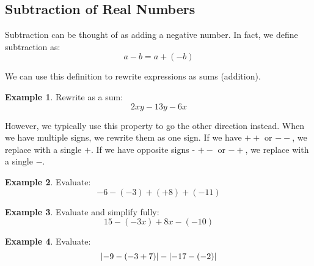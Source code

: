 \documentclass[addpoints,12pt]{exam}
\theoremstyle{definition}
\newtheorem{example}{Example}[subsection]
\begin{document}
\setcounter{section}{1}
\setcounter{subsection}{5}

\subsection{Subtraction of Real Numbers}

\noindent Subtraction can be thought of as adding a negative number. In fact, we define subtraction as: \[a - b = a + (-b)\]

\noindent We can use this definition to rewrite expressions as sums (addition).

\vspace{.1in}

\begin{example}
Rewrite as a sum: \[2xy - 13y - 6x\]
\vspace{.75in}
\end{example}

\noindent However, we typically use this property to go the other direction instead. When we have multiple signs, we rewrite them as one sign. If we have $+ +$ or $- -$, we replace with a single $+$. If we have opposite signs - $+ - $ or $- +$, we replace with a single $-$.

\vspace{.1in}

\begin{example}
Evaluate: \[-6 - (-3) + (+8) + (-11)\]
\vspace{1in}
\end{example}

\begin{example}
Evaluate and simplify fully: \[15 - (-3x) + 8x - (-10)\]
\vspace{1.5in}
\end{example}

\newpage

\begin{example}
Evaluate: \[ \abs{-9 - (-3 + 7)} - \abs{-17 - (-2)}\]
\end{example}
\end{document}
